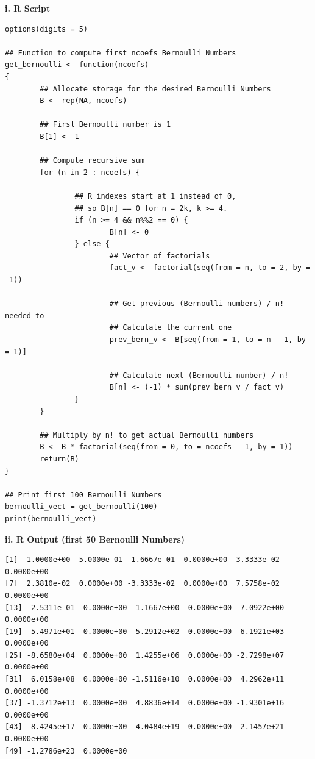\documentclass{article}
\begin{document}
\noindent\begin{large}\textbf{i. R Script}\end{large}

\begin{lstlisting}
options(digits = 5)

## Function to compute first ncoefs Bernoulli Numbers
get_bernoulli <- function(ncoefs)
{
		## Allocate storage for the desired Bernoulli Numbers
        B <- rep(NA, ncoefs)

        ## First Bernoulli number is 1
        B[1] <- 1
	
    	## Compute recursive sum
        for (n in 2 : ncoefs) {
				
                ## R indexes start at 1 instead of 0,
                ## so B[n] == 0 for n = 2k, k >= 4.
                if (n >= 4 && n%%2 == 0) {
                        B[n] <- 0
                } else {
                		## Vector of factorials
                        fact_v <- factorial(seq(from = n, to = 2, by = -1))
                        
                        ## Get previous (Bernoulli numbers) / n! needed to 
                        ## Calculate the current one
                        prev_bern_v <- B[seq(from = 1, to = n - 1, by = 1)]
                        
                        ## Calculate next (Bernoulli number) / n!
                        B[n] <- (-1) * sum(prev_bern_v / fact_v)
                }
        }
		
        ## Multiply by n! to get actual Bernoulli numbers
        B <- B * factorial(seq(from = 0, to = ncoefs - 1, by = 1))
        return(B)
}

## Print first 100 Bernoulli Numbers
bernoulli_vect = get_bernoulli(100)
print(bernoulli_vect)
\end{lstlisting}

\vspace{5mm}

\noindent\begin{large}\textbf{ii. R Output (first 50 Bernoulli Numbers)}\end{large}
\begin{verbatim}
[1]  1.0000e+00 -5.0000e-01  1.6667e-01  0.0000e+00 -3.3333e-02  0.0000e+00
[7]  2.3810e-02  0.0000e+00 -3.3333e-02  0.0000e+00  7.5758e-02  0.0000e+00
[13] -2.5311e-01  0.0000e+00  1.1667e+00  0.0000e+00 -7.0922e+00  0.0000e+00
[19]  5.4971e+01  0.0000e+00 -5.2912e+02  0.0000e+00  6.1921e+03  0.0000e+00
[25] -8.6580e+04  0.0000e+00  1.4255e+06  0.0000e+00 -2.7298e+07  0.0000e+00
[31]  6.0158e+08  0.0000e+00 -1.5116e+10  0.0000e+00  4.2962e+11  0.0000e+00
[37] -1.3712e+13  0.0000e+00  4.8836e+14  0.0000e+00 -1.9301e+16  0.0000e+00
[43]  8.4245e+17  0.0000e+00 -4.0484e+19  0.0000e+00  2.1457e+21  0.0000e+00
[49] -1.2786e+23  0.0000e+00
\end{verbatim}
\end{document}
